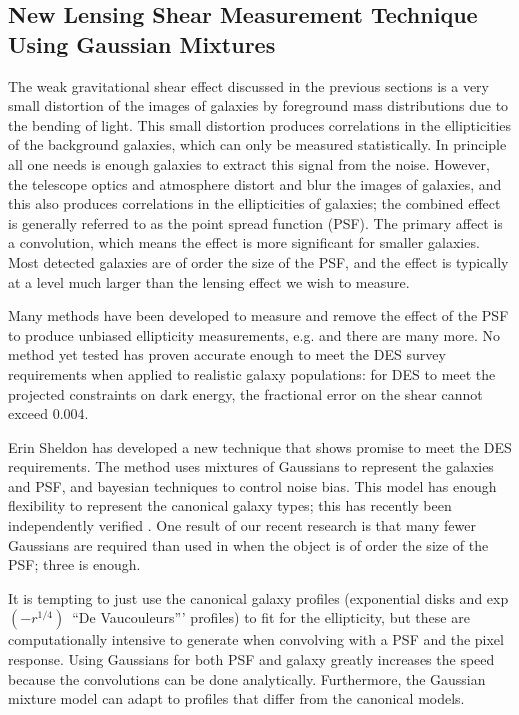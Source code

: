 \documentclass[12pt]{article}
\newcommand{\devauc}{De Vaucouleurs'}
\newcommand{\devprof}{exp$(-r^{1/4})$}
\begin{document}
\subsection{New Lensing Shear Measurement Technique Using Gaussian Mixtures}
\label{sec:gmix}

The weak gravitational shear effect discussed in the previous sections is a
very small distortion of the images of galaxies by foreground mass
distributions due to the bending of light.  This small distortion produces
correlations in the ellipticities of the background galaxies, which can only be
measured statistically.  In principle all one needs is enough galaxies to
extract this signal from the noise.  However, the telescope optics and
atmosphere distort and blur the images of galaxies, and this also produces
correlations in the ellipticities of galaxies; the combined effect is generally
referred to as the point spread function (PSF). The primary affect is a
convolution, which means the effect is more significant for smaller galaxies.
Most detected galaxies are of order the size of the PSF, and the effect is
typically at a level much larger than the lensing effect we wish to measure.

Many methods have been developed to measure and remove the effect of the PSF to
produce unbiased ellipticity measurements, e.g.
\cite{ksb95,Bern02,Miller07,Melchior11} and there are many more.  No method yet
tested has proven accurate enough to meet the DES survey requirements when
applied to realistic galaxy populations:  for DES to meet the projected
constraints on dark energy, the fractional error on the shear cannot exceed
0.004.

Erin Sheldon has developed a new technique that shows promise to meet the DES
requirements.  The method uses mixtures of Gaussians to represent the galaxies
and PSF, and bayesian techniques to control noise bias.  This model has enough
flexibility to represent the canonical galaxy types; this has recently been
independently verified \citep{HoggGMix12}.  One result of our recent research
is that many fewer Gaussians are required than used in \cite{HoggGMix12} when
the object is of order the size of the PSF; three is enough.  

It is tempting to just use the canonical galaxy profiles (exponential disks and
\devprof\ ``\devauc'' profiles) to fit for the ellipticity, but these are
computationally intensive to generate when convolving with a PSF and the pixel
response.  Using Gaussians for both PSF and galaxy greatly increases the speed
because the convolutions can be done analytically.   Furthermore, the Gaussian
mixture model can adapt to profiles that differ from the canonical models.
\end{document}
